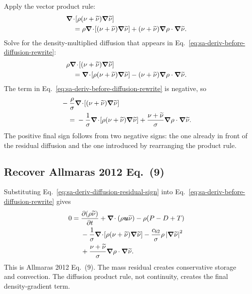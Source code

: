 \documentclass[11pt]{article}
\newcommand{\SAgrad}{\boldsymbol{\nabla}}
\newcommand{\SAdiv}{\boldsymbol{\nabla}\!\cdot}
\begin{document}
Apply the vector product rule:
\begin{align}
  &\SAdiv\!\left[
    \rho(\nu+\widetilde{\nu})\SAgrad\widetilde{\nu}
  \right] \notag\\
  &\quad={}
  \rho\SAdiv\!\left[
    (\nu+\widetilde{\nu})\SAgrad\widetilde{\nu}
  \right]
  +(\nu+\widetilde{\nu})
   \SAgrad\rho\mathbin{\cdot}\SAgrad\widetilde{\nu}.
  \label{eq:sa-deriv-diffusion-product}
\end{align}
Solve for the density-multiplied diffusion that appears in
Eq.~\eqref{eq:sa-deriv-before-diffusion-rewrite}:
\begin{align}
  &\rho\SAdiv\!\left[
    (\nu+\widetilde{\nu})\SAgrad\widetilde{\nu}
  \right] \notag\\
  &\quad={}
  \SAdiv\!\left[
    \rho(\nu+\widetilde{\nu})\SAgrad\widetilde{\nu}
  \right]
  -(\nu+\widetilde{\nu})
   \SAgrad\rho\mathbin{\cdot}\SAgrad\widetilde{\nu}.
  \label{eq:sa-deriv-diffusion-rearranged}
\end{align}
The term in Eq.~\eqref{eq:sa-deriv-before-diffusion-rewrite} is negative, so
\begin{align}
  &-\frac{\rho}{\sigma}\SAdiv\!\left[
    (\nu+\widetilde{\nu})\SAgrad\widetilde{\nu}
  \right] \notag\\
  &\quad={}
  -\frac{1}{\sigma}\SAdiv\!\left[
    \rho(\nu+\widetilde{\nu})\SAgrad\widetilde{\nu}
  \right]
  +\frac{\nu+\widetilde{\nu}}{\sigma}
   \SAgrad\rho\mathbin{\cdot}\SAgrad\widetilde{\nu}.
  \label{eq:sa-deriv-diffusion-residual-sign}
\end{align}
The positive final sign follows from two negative signs: the one already in
front of the residual diffusion and the one introduced by rearranging the
product rule.

\subsection{Recover Allmaras 2012 Eq.~(9)}

Substituting Eq.~\eqref{eq:sa-deriv-diffusion-residual-sign} into
Eq.~\eqref{eq:sa-deriv-before-diffusion-rewrite} gives
\begin{align}
  0={}&
  \frac{\partial(\rho\widetilde{\nu})}{\partial t}
  +\SAdiv(\rho\boldsymbol u\widetilde{\nu})
  -\rho(P-D+T) \notag\\
  &-\frac{1}{\sigma}\SAdiv\!\left[
    \rho(\nu+\widetilde{\nu})\SAgrad\widetilde{\nu}
  \right]
  -\frac{c_{b2}}{\sigma}\rho
   \left|\SAgrad\widetilde{\nu}\right|^2 \notag\\
  &+\frac{\nu+\widetilde{\nu}}{\sigma}
   \SAgrad\rho\mathbin{\cdot}\SAgrad\widetilde{\nu}.
  \label{eq:sa-deriv-paper-final}
\end{align}
This is Allmaras 2012 Eq.~(9).  The mass residual creates conservative storage and
convection.  The diffusion product rule, not continuity, creates the final
density-gradient term.
\end{document}
